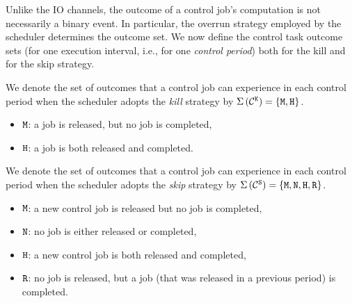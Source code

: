 Unlike the IO channels, the outcome of a control job's computation is not necessarily a binary event.
In particular, the overrun strategy employed by the scheduler determines the outcome set.
We now define the control task outcome sets (for one execution interval, i.e., for one \emph{control period}) both for the kill and for the skip strategy.
%
\begin{definition}%
    \label{def:kill}%
    We denote the set of outcomes that a control job can experience in each control period when the scheduler adopts the \emph{kill} strategy by $\Sigma\,({\mathcal{C}^{\texttt{K}}}) = \left\{ \texttt{M}, \texttt{H} \right\}$.
    \begin{itemize}
        \item $\texttt{M}$: a job is released, but no job is completed, 
        \item $\texttt{H}$: a job is both released and completed.
    \end{itemize}
\end{definition}
%
\begin{definition}%
    \label{def:skip}%
    We denote the set of outcomes that a control job can experience in each control period when the scheduler adopts the \emph{skip} strategy by $\Sigma\,({\mathcal{C}^{\texttt{S}}}) = \left\{ \texttt{M}, \texttt{N}, \texttt{H}, \texttt{R} \right\}$.
    \begin{itemize}
        \item $\texttt{M}$: a new control job is released but no job is completed,
        \item $\texttt{N}$: no job is either released or completed, 
        \item $\texttt{H}$: a new control job is both released and completed,
        \item $\texttt{R}$: no job is released, but a job (that was released in a previous period) is completed.
    \end{itemize}
\end{definition}
%

